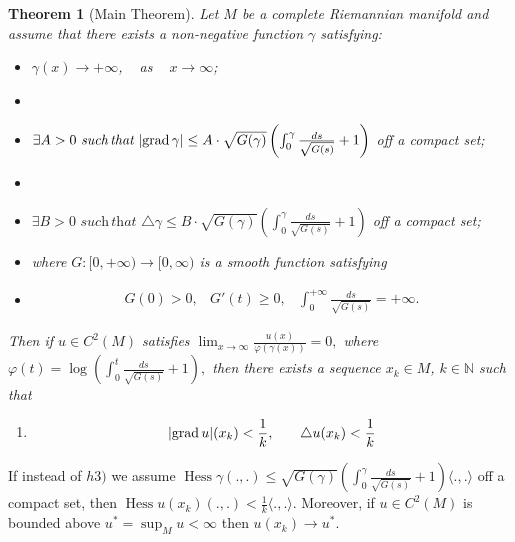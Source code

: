 \documentclass[a4paper]{amsart}
\newtheorem{theorem}{Theorem}
\begin{document}
\begin{theorem}[Main Theorem]\label{Principal Theorem}
Let $M$ be a complete Riemannian manifold and assume that there exists a non-negative function $\gamma $ satisfying:
\begin{itemize}
\item[h1)] $\gamma (x) \rightarrow  +\infty $, \,\,\, as \,\,\, $x\rightarrow \infty $;
\item[]
\item[h2)]$\exists A > 0 \,\, \textit{such}\,\textit{that}  \,\, \vert {{{\rm{grad}\,}}} \gamma\vert \leq A \cdot \sqrt{G(\gamma)}\left(\int_{0}^{\gamma}\frac{ds}{\sqrt{G(s)}}+1\right) $ off a compact set;
\item[]
\item[h3)]$\exists B > 0 \,\, \textit{such} \,\textit{that} \,\, \triangle \gamma \leq B \cdot \sqrt{G(\gamma)}\left(\int_{0}^{\gamma}\frac{ds}{\sqrt{G(s)}}+1\right) $ off a compact set;
     \item[] where $ G:[0,+\infty)\to [0, \infty) $ is a smooth function  satisfying
\item[] \begin{equation}\label{eq6}
\begin{array}{llll} G(0) > 0, &   G'(t) \geq 0,& \displaystyle{\int_{0}^{+\infty}\frac{ds}{\sqrt{G(s)}} = +\infty}.
\end{array}
\end{equation}
    \end{itemize} Then if $ u \in C^{2}(M)$
satisfies
$
\displaystyle{\lim_{x \rightarrow \infty}\frac{u(x)}{\varphi(\gamma(x))}} = 0 ,
$
where
$
\displaystyle{\varphi(t) = \log\left(\int_{0}^{t}\frac{ds}{\sqrt{G(s)}}+1\right)},
$
then there exists a sequence ${x_{k}} \in M$, $k \in \mathbb{N} $ such that
\begin{enumerate}
\item[]\begin{equation} \begin{array}{lll}\displaystyle{\vert {{{\rm{grad}\,}}} u\vert(x_{k}) < \frac{1}{k}},& &
 \displaystyle{\triangle u(x_{k}) < \frac{1}{k}} \end{array}\end{equation}
\end{enumerate}\end{theorem}If instead of $h3)$ we assume
$ \displaystyle{\operatorname{Hess} \gamma (.,.)  \leq \sqrt{G(\gamma)}\left(\int_{0}^{\gamma}\frac{ds}{\sqrt{G(s)}}+1\right)}\langle .,. \rangle $ off a compact set, then
 $ \displaystyle{\operatorname{Hess} u(x_{k}) ( .,. ) < \frac{1}{k} \langle . , . \rangle} $.
Moreover, if $u \in C^{2}(M)$  is bounded above $u^{\ast}=\sup_{M}u<\infty$ then  $u(x_{k})\to u^{\ast}$.
\end{document}
